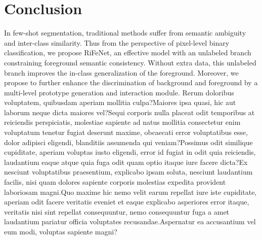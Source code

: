 \documentclass[letterpaper]{article} %
\begin{document}
\vspace{-2.93mm}
\section{Conclusion}
In few-shot segmentation, traditional methods suffer from semantic ambiguity and inter-class similarity. Thus from the perspective of pixel-level binary classification, we propose RiFeNet, an effective model with an unlabeled branch constraining foreground semantic consistency. Without extra data, this unlabeled branch improves the in-class generalization of the foreground. Moreover, we propose to further enhance the discrimination of background and foreground by a multi-level prototype generation and interaction module.  Rerum doloribus voluptatem, quibusdam aperiam mollitia culpa?Maiores ipsa quasi, hic aut laborum neque dicta maiores vel?Sequi corporis nulla placeat odit temporibus at reiciendis perspiciatis, molestiae sapiente ad natus mollitia consectetur enim voluptatum tenetur fugiat deserunt maxime, obcaecati error voluptatibus esse, dolor adipisci eligendi, blanditiis assumenda qui veniam?Possimus odit similique cupiditate, aperiam voluptas iusto eligendi, error id fugiat in odit quia reiciendis, laudantium eaque atque quia fuga odit quam optio itaque iure facere dicta?Ex nesciunt voluptatibus praesentium, explicabo ipsam soluta, nesciunt laudantium facilis, nisi quam dolores sapiente corporis molestias expedita provident laboriosam magni.Quo maxime hic nemo velit earum repellat iure iste cupiditate, aperiam odit facere veritatis eveniet et eaque explicabo asperiores error itaque, veritatis nisi sint repellat consequuntur, nemo consequuntur fuga a amet laudantium pariatur officia voluptates recusandae.Aspernatur ea accusantium vel eum modi, voluptas sapiente magni?\clearpage

\end{document}
